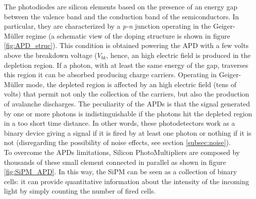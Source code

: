 The photodiodes are silicon elements based on the presence of an energy gap between the valence band and the conduction band of the semiconductors. In particular, they are characterized by a \textit{p-n} junction operating in the Geiger-M\"uller regime (a schematic view of the doping structure is shown in figure \ref{fig:APD_struc}). This condition is obtained powering the APD with a few volts above the breakdown voltage ($V_{bk}$, hence, an high electric field is produced in the depletion region. If a photon, with at least the same energy of the gap, traverses this region it can be absorbed producing charge carriers. Operating in Geiger-M\"uller mode, the depleted region is affected by an high electric field (tens of volts) that permit not only the collection of the carriers, but also the production of avalanche discharges. 
The peculiarity of the APDs is that the signal generated by one or more photons is indistinguishable if the photons hit the depleted region in a too short time distance. In other words, these photodetectors work as a binary device giving a signal if it is fired by at least one photon or nothing if it is not (disregarding the possibility of noise effects, see section \ref{subsec:noise}).\\
To overcome the APDs limitations, Silicon PhotoMultipliers are composed by thousands of these small element connected in parallel as shown in figure \ref{fig:SiPM_APD}. In this way, the SiPM can be seen as a collection of binary cells: it can provide quantitative information about the intensity of the incoming light by simply counting the number of fired cells.

